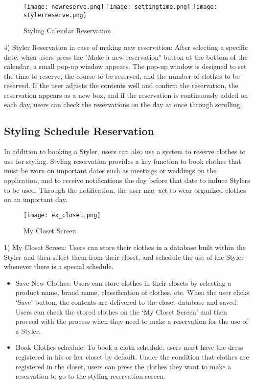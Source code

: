 \documentclass[conference]{IEEEtran}
\begin{document}
\begin{figure}[htbp]
\centerline{
\texttt{[image: newreserve.png]}
\texttt{[image: settingtime.png]}
\texttt{[image: stylerreserve.png]}
}
\caption{Styling Calendar Reservation}
\label{fig}
\end{figure}
4) Styler Reservation in case of making new reservation: After selecting a specific date, when users press the "Make a new reservation" button at the bottom of the calendar, a small pop-up window appears. The pop-up window is designed to set the time to reserve, the course to be reserved, and the number of clothes to be reserved. If the user adjusts the contents well and confirm the reservation, the reservation appears as a new box, and if the reservation is continuously added on each day, users can check the reservations on the day at once through scrolling.\\

\subsection{Styling Schedule Reservation}
In addition to booking a Styler, users can also use a system to reserve clothes to use for styling. Styling reservation provides a key function to book clothes that must be worn on important dates such as meetings or weddings on the application, and to receive notifications the day before that date to induce Stylers to be used. Through the notification, the user may act to wear organized clothes on an important day.\\
\begin{figure}[htbp]
\centerline{\texttt{[image: ex\_closet.png]}}
\label{fig}
\caption{My Closet Screen}
\end{figure}

1) My Closet Screen: Users can store their clothes in a database built within the Styler and then select them from their closet, and schedule the use of the Styler whenever there is a special schedule.
\begin{itemize}
    \item Save New Clothes: Users can store clothes in their closets by selecting a product name, brand name, classification of clothes, etc. When the user clicks ‘Save’ button, the contents are delivered to the closet database and saved. Users can check the stored clothes on the ‘My Closet Screen’ and then proceed with the process when they need to make a reservation for the use of a Styler.
    \item Book Clothes schedule: To book a cloth schedule, users must have the dress registered in his or her closet by default. Under the condition that clothes are registered in the closet, users can press the clothes they want to make a reservation to go to the styling reservation screen.\\
\end{itemize}
\end{document}
